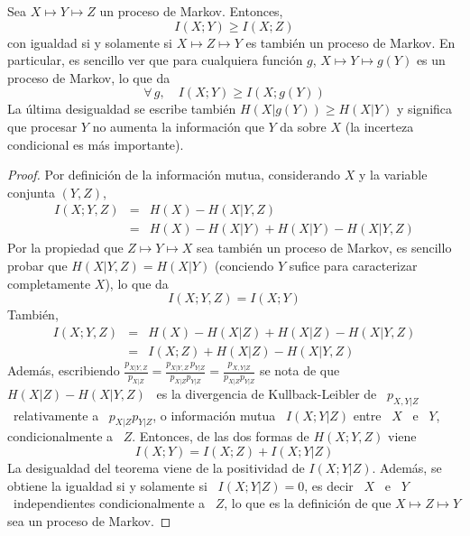 \begin{teorema}
  Sea  $X \mapsto  Y \mapsto  Z$ un  proceso de  Markov. Entonces,
  \[
  I(X;Y) \ge I(X;Z)
  \]
  con igualdad si y solamente si $X \mapsto Z \mapsto Y$ es tambi\'en un proceso
  de Markov. En  particular, es sencillo ver que  para cualquiera funci\'on $g$,
  $X \mapsto Y \mapsto g(Y)$ es un proceso de Markov, lo que da
  \[
  \forall \, g, \quad I(X;Y) \ge I(X;g(Y))
  \]
  La  \'ultima  desigualdad  se  escribe  tambi\'en  $H(X|g(Y))  \ge  H(X|Y)$  y
  significa que  procesar $Y$ no aumenta  la informaci\'on que $Y$  da sobre $X$
  (la incerteza condicional es m\'as importante).
\end{teorema}
%
\begin{proof}
  Por definici\'on  de la  informaci\'on mutua, considerando  $X$ y  la variable
  conjunta $(Y,Z)$,
  \begin{eqnarray*}
  I(X ; Y,Z) & = & H(X) - H(X|Y,Z)\\[2.5mm]
  & = & H(X) - H(X|Y) + H(X|Y) - H(X|Y,Z)
  \end{eqnarray*}
  \noindent  Por la  propiedad que  $Z  \mapsto Y  \mapsto X$  sea tambi\'en  un
  proceso de Markov,  es sencillo probar que $H(X|Y,Z)  = H(X|Y)$ (conciendo $Y$
  sufice para caracterizar completamente $X$), lo que da
  \[
  I(X;Y,Z) = I(X;Y)
  \]
  Tambi\'en,
  \begin{eqnarray*}
  I(X ; Y,Z) & = & H(X) - H(X|Z) + H(X|Z) - H(X|Y,Z)\\[2.5mm]
  & = & I(X;Z) + H(X|Z) - H(X|Y,Z)
  \end{eqnarray*}
  \noindent  Adem\'as, escribiendo $\frac{p_{X|Y,Z}}{p_{X|Z}}  = \frac{p_{X|Y,Z}
    \, p_{Y|Z}}{p_{X|Z} p_{Y|Z}} = \frac{p_{X,Y|Z}}{p_{X|Z} p_{Y|Z}}$
  se nota de  que \ $H(X|Z) - H(X|Y,Z)$ \ es  la divergencia de Kullback-Leibler
  de \ $p_{X,Y|Z}$ \ relativamente  a \ $p_{X|Z} p_{Y|Z}$, o informaci\'on mutua
  \ $I(X;Y|Z)$ entre  \ $X$ \ e  \ $Y$, condicionalmente a \  $Z$.  Entonces, de
  las dos formas de $H(X;Y,Z)$ viene
  \[
  I(X;Y) = I(X;Z) + I(X;Y|Z)
  \]
  La desigualdad del teorema viene de la positividad de $I(X;Y|Z)$. Adem\'as, se
  obtiene la igualdad si  y solamente si \ $I(X;Y|Z) = 0$, es decir  \ $X$ \ e \
  $Y$ \  independientes condicionalmente a \  $Z$, lo que es  la definici\'on de
  que $X \mapsto Z \mapsto Y$ sea un proceso de Markov.
\end{proof}

